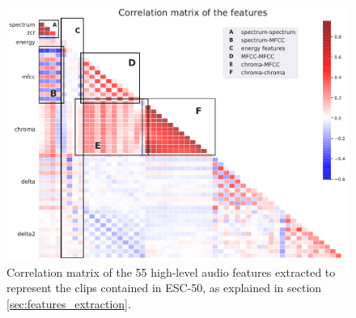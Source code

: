 \begin{figure}[t]
	\centering
	\includegraphics[scale=0.5]{pictures/correlation_matrix}
	\caption{Correlation matrix of the 55 high-level audio features extracted to represent the clips contained in ESC-50, as explained in section \ref{sec:features_extraction}.}
	\label{fig:correlation_matrix}
\end{figure}